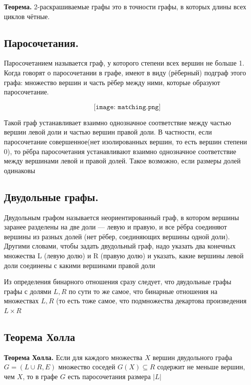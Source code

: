 \documentclass[a4paper, 10pt]{article}
\begin{document}
\textbf{Теорема.} 2-раскрашиваемые графы это в точности графы, в которых длины всех циклов чётные.


\subsection{Паросочетания.}

Паросочетанием называется граф, у которого степени всех вершин не больше 1. Когда говорят о паросочетании в графе, имеют в виду (рёберный) подграф этого графа: множество вершин и часть рёбер между ними, которые образуют паросочетание.

$$\texttt{[image: matсhing.png]}$$

Такой граф устанавливает взаимно однозначное соответствие между частью вершин левой доли и частью вершин правой доли. В частности, если паросочетание совершенное(нет изолированных вершин, то есть вершин степени 0), то рёбра паросочетания устанавливают взаимно однозначное соответствие между вершинами левой и правой долей. Такое возможно, если размеры долей одинаковы




\subsection{Двудольные графы.}

Двудольным графом называется неориентированный граф, в котором вершины заранее разделены на две доли — левую и правую, и все рёбра соединяют вершины из разных долей (нет рёбер, соединяющих вершины одной доли). Другими словами, чтобы задать двудольный граф, надо указать два конечных множества L (левую долю) и R (правую долю) и указать, какие вершины левой доли соединены с какими вершинами правой доли

Из определения бинарного отношения сразу следует, что двудольные графы графы с долями $L, R$ по сути то же самое, что бинарные отношения на множествах $L, R$ (то есть тоже самое, что подмножества декартова произведения $L \times R$



\subsection{Теорема Холла}

\textbf{Теорема Холла.} Если для каждого множества $X$ вершин двудольного графа $G = (L \cup R, E)$ множество соседей $G(X) \subseteq R$ содержит не меньше вершин, чем $X$, то в графе $G$ есть паросочетания размера $|L|$
\end{document}
